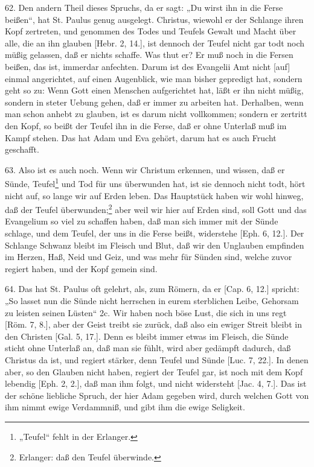 62. Den andern Theil dieses Spruchs, da er sagt: „Du wirst ihn in die Ferse beißen“, hat St. Paulus genug ausgelegt. Christus, wiewohl er der Schlange ihren Kopf zertreten, und genommen des Todes und Teufels Gewalt und Macht über alle, die an ihn glauben [Hebr. 2, 14.], ist dennoch der Teufel nicht gar todt noch müßig gelassen, daß er nichts schaffe. Was thut er? Er muß noch in die Fersen beißen, das ist, immerdar anfechten. Darum ist des Evangelii Amt nicht [auf] einmal angerichtet, auf einen Augenblick, wie man bisher gepredigt hat, sondern geht so zu: Wenn Gott einen Menschen aufgerichtet hat, läßt er ihn nicht müßig, sondern in steter Uebung gehen, daß er immer zu arbeiten hat. Derhalben, wenn man schon anhebt zu glauben, ist es darum nicht vollkommen; sondern er zertritt den Kopf, so beißt der Teufel ihn in die Ferse, daß er ohne Unterlaß muß im Kampf stehen. Das hat Adam und Eva gehört, darum hat es auch Frucht geschafft.

63. Also ist es auch noch. Wenn wir Christum erkennen, und wissen, daß er Sünde, Teufel\footnote{„Teufel“ fehlt in der Erlanger.} und Tod für uns überwunden hat, ist sie dennoch nicht todt, hört nicht auf, so lange wir auf Erden leben. Das Hauptstück haben wir wohl hinweg, daß der Teufel überwunden;\footnote{Erlanger: daß den Teufel überwinde.} aber weil wir hier auf Erden sind, soll Gott und das Evangelium so viel zu schaffen haben, daß man sich immer mit der Sünde schlage, und dem Teufel, der uns in die Ferse beißt, widerstehe [Eph. 6, 12.]. Der Schlange Schwanz bleibt im Fleisch und Blut, daß wir den Unglauben empfinden im Herzen, Haß, Neid und Geiz, und was mehr für Sünden sind, welche zuvor regiert haben, und der Kopf gemein sind.

64. Das hat St. Paulus oft gelehrt, als, zum Römern, da er [Cap. 6, 12.] spricht: „So lasset nun die Sünde nicht herrschen in eurem sterblichen Leibe, Gehorsam zu leisten seinen Lüsten“ 2c. Wir haben noch böse Lust, die sich in uns regt [Röm. 7, 8.], aber der Geist treibt sie zurück, daß also ein ewiger Streit bleibt in den Christen [Gal. 5, 17.]. Denn es bleibt immer etwas im Fleisch, die Sünde sticht ohne Unterlaß an, daß man sie fühlt, wird aber gedämpft dadurch, daß Christus da ist, und regiert stärker, denn Teufel und Sünde [Luc. 7, 22.]. In denen aber, so den Glauben nicht haben, regiert der Teufel gar, ist noch mit dem Kopf lebendig [Eph. 2, 2.], daß man ihm folgt, und nicht widersteht [Jac. 4, 7.]. Das ist der schöne liebliche Spruch, der hier Adam gegeben wird, durch welchen Gott von ihm nimmt ewige Verdammniß, und gibt ihm die ewige Seligkeit.

